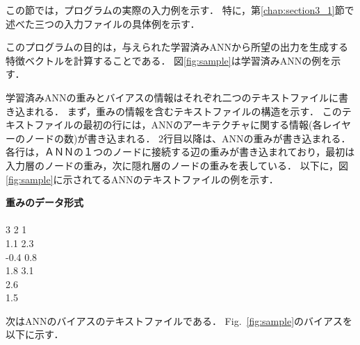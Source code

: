 \documentclass[11pt,titlepage,dvipdfmx,twoside]{jsbook}
\begin{document}
この節では，プログラムの実際の入力例を示す．
特に，第\ref{chap:section3_1}節で述べた三つの入力ファイルの具体例を示す．

このプログラムの目的は，与えられた学習済みANNから所望の出力を生成する特徴ベクトルを計算することである．
図\ref{fig:sample}は学習済みANNの例を示す．


学習済みANNの重みとバイアスの情報はそれぞれ二つのテキストファイルに書き込まれる．
まず，重みの情報を含むテキストファイルの構造を示す．
このテキストファイルの最初の行には，ANNのアーキテクチャに関する情報(各レイヤーのノードの数)が書き込まれる．
2行目以降は、ANNの重みが書き込まれる．
各行は，ＡＮＮの１つのノードに接続する辺の重みが書き込まれており，最初は入力層のノードの重み，次に隠れ層のノードの重みを表している．
以下に，図\ref{fig:sample}に示されてるANNのテキストファイルの例を示す．

\bigskip

\begin{oframed}
{\bf 重みのデータ形式}\\\\
3 2 1\\
1.1 2.3\\
-0.4 0.8\\
1.8 3.1\\
2.6\\
1.5\\
\end{oframed}

\bigskip


次はANNのバイアスのテキストファイルである．
Fig.~\ref{fig:sample}のバイアスを以下に示す．
\end{document}
